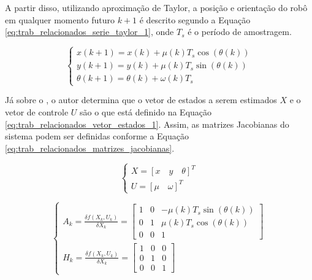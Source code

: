 \documentclass[acronym, symbols]{fei}
\begin{document}
	A partir disso, utilizando aproximação de Taylor, a posição e orientação do robô em qualquer momento futuro $k + 1$ é descrito segundo a Equação \eqref{eq:trab_relacionados_serie_taylor_1}, onde $T_s$ é o período de amostragem.
	
	\begin{equation} \label{eq:trab_relacionados_serie_taylor_1}
		\begin{cases*}
			x(k+1) = x(k) + \mu(k)T_s\cos{(\theta(k))} \\
			y(k+1) = y(k) + \mu(k)T_s\sin{(\theta(k))} \\
			\theta(k+1) = \theta(k) + \omega(k)T_s
		\end{cases*}
	\end{equation}
	
	Já sobre o , o autor determina que o vetor de estados a serem estimados $X$ e o vetor de controle $U$ são o que está definido na Equação \eqref{eq:trab_relacionados_vetor_estados_1}. Assim, as matrizes Jacobianas do sistema podem ser definidas conforme a Equação \eqref{eq:trab_relacionados_matrizes_jacobianas}.
	
	\begin{equation}\label{eq:trab_relacionados_vetor_estados_1}
		\begin{cases}
			X = [x \quad y \quad \theta]^T \\
			U = [\mu \quad \omega]^T
		\end{cases}
	\end{equation}
	
	\begin{equation}\label{eq:trab_relacionados_matrizes_jacobianas}
		\begin{cases}
			A_k = \frac{\delta f(X_k, U_k)}{\delta X_k} = \begin{bmatrix}
				1 & 0 & -\mu(k)T_s\sin{(\theta(k))} \\
				0 & 1 & \mu(k)T_s\cos{(\theta(k))}  \\
				0 & 0 & 1
			\end{bmatrix} \\[30pt]
			
			H_k = \frac{\delta f(X_k, U_k)}{\delta X_k} = 
			\begin{bmatrix}
				1 & 0 & 0 \\
				0 & 1 & 0 \\
				0 & 0 & 1 
			\end{bmatrix}		
		\end{cases}
	\end{equation}
	
\end{document}
